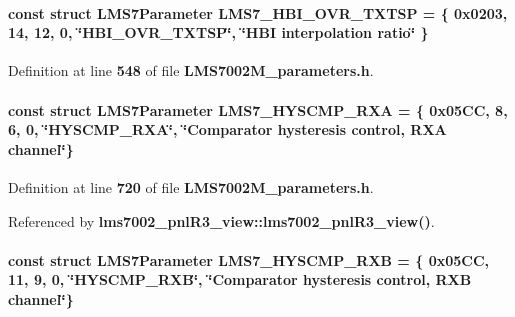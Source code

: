 \paragraph[{L\+M\+S7\+\_\+\+H\+B\+I\+\_\+\+O\+V\+R\+\_\+\+T\+X\+T\+SP}]{\setlength{\rightskip}{0pt plus 5cm}const struct {\bf L\+M\+S7\+Parameter} L\+M\+S7\+\_\+\+H\+B\+I\+\_\+\+O\+V\+R\+\_\+\+T\+X\+T\+SP = \{ 0x0203, 14, 12, 0, \char`\"{}\+H\+B\+I\+\_\+\+O\+V\+R\+\_\+\+T\+X\+T\+S\+P\char`\"{}, \char`\"{}\+H\+B\+I interpolation ratio\char`\"{} \}\hspace{0.3cm}{\ttfamily [static]}}\label{LMS7002M__parameters_8h_ae34ba4fe78b82162be27c6179212c768}


Definition at line {\bf 548} of file {\bf L\+M\+S7002\+M\+\_\+parameters.\+h}.

\paragraph[{L\+M\+S7\+\_\+\+H\+Y\+S\+C\+M\+P\+\_\+\+R\+XA}]{\setlength{\rightskip}{0pt plus 5cm}const struct {\bf L\+M\+S7\+Parameter} L\+M\+S7\+\_\+\+H\+Y\+S\+C\+M\+P\+\_\+\+R\+XA = \{ 0x05\+C\+C, 8, 6, 0, \char`\"{}\+H\+Y\+S\+C\+M\+P\+\_\+\+R\+X\+A\char`\"{}, \char`\"{}\+Comparator hysteresis control, R\+X\+A channel\char`\"{}\}\hspace{0.3cm}{\ttfamily [static]}}\label{LMS7002M__parameters_8h_a5be85bcf2ff341b41c03435d693f2e61}


Definition at line {\bf 720} of file {\bf L\+M\+S7002\+M\+\_\+parameters.\+h}.



Referenced by {\bf lms7002\+\_\+pnl\+R3\+\_\+view\+::lms7002\+\_\+pnl\+R3\+\_\+view()}.

\paragraph[{L\+M\+S7\+\_\+\+H\+Y\+S\+C\+M\+P\+\_\+\+R\+XB}]{\setlength{\rightskip}{0pt plus 5cm}const struct {\bf L\+M\+S7\+Parameter} L\+M\+S7\+\_\+\+H\+Y\+S\+C\+M\+P\+\_\+\+R\+XB = \{ 0x05\+C\+C, 11, 9, 0, \char`\"{}\+H\+Y\+S\+C\+M\+P\+\_\+\+R\+X\+B\char`\"{}, \char`\"{}\+Comparator hysteresis control, R\+X\+B channel\char`\"{}\}\hspace{0.3cm}{\ttfamily [static]}}\label{LMS7002M__parameters_8h_ae14bdf841009ea95c5fe8345571f5bff}


